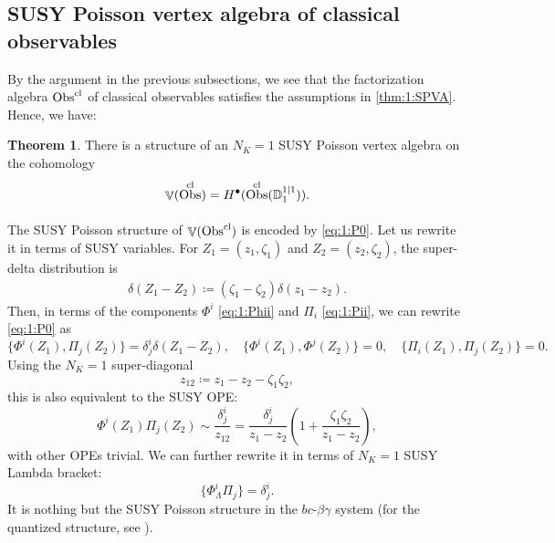 \documentclass[final,reqno]{amsart}
\numberwithin{equation}{section}
\theoremstyle{definition}
\newtheorem{thm}{Theorem}[section]
\newcommand{\bl}{\bullet}
\newcommand{\ceq}{\coloneqq} %
\newcommand{\tcl}{\textup{cl}}
\newcommand{\bbC}{\mathbb{C}}
\newcommand{\bbR}{\mathbb{R}}
\newcommand{\sD}{\mathbb{D}^{1|1}}
\newcommand{\abs}[1]{\left| #1 \right|}
\newcommand{\cObs}[1]{\mathop{\Obs^{\textup{cl}}_{#1}}}
\DeclareMathOperator{\bbV}{\mathbb{V}}
\DeclareMathOperator{\Obs}{Obs}
\begin{document}

\subsection{SUSY Poisson vertex algebra of classical observables}
\label{ss:2.8}

By the argument in the previous subsections, 
we see that the factorization algebra $\cObs{}$ of classical observables 
satisfies the assumptions in \cref{thm:1:SPVA}. 
Hence, we have:

\begin{thm}\label{thm:2:V(cObs)}
There is a structure of an $N_K=1$ SUSY Poisson vertex algebra on the cohomology
\[
 \bbV(\cObs{}) = H^{\bl}(\cObs{}(\sD_1)).
\]
\end{thm}

The SUSY Poisson structure of $\bbV(\cObs{})$ is encoded by \eqref{eq:1:P0}.
Let us rewrite it in terms of SUSY variables.
For $Z_1=(z_1,\zeta_1)$ and $Z_2=(z_2,\zeta_2)$, 
the super-delta distribution is
\begin{align}\label{eq:2:Sdelta}
 \delta(Z_1-Z_2) \ceq (\zeta_1-\zeta_2) \delta(z_1-z_2).
\end{align}
Then, in terms of the components $\Phi^i$ \eqref{eq:1:Phii} 
and $\Pi_i$ \eqref{eq:1:Pii}, we can rewrite \eqref{eq:1:P0} as 
\[
 \{\Phi^i(Z_1),\Pi_j (Z_2)\} = \delta^i_j \delta(Z_1-Z_2), \quad
 \{\Phi^i(Z_1),\Phi^j(Z_2)\} =  0, \quad 
 \{\Pi_i (Z_1),\Pi_j (Z_2)\} =  0.
\]
Using the $N_K=1$ super-diagonal 
\[
 z_{12} \ceq z_1-z_2-\zeta_1\zeta_2, 
\]
this is also equivalent to the SUSY OPE:
\[
 \Phi^i(Z_1)\Pi_j(Z_2) \sim \frac{\delta^i_j}{z_{12}} = 
 \frac{\delta^i_j}{z_1-z_2}\left(1+\frac{\zeta_1\zeta_2}{z_1-z_2}\right),
\]
with other OPEs trivial.
We can further rewrite it in terms of $N_K=1$ SUSY Lambda bracket:
\[
 \{\Phi^i_\Lambda \Pi_j\} = \delta^i_j.
\]
It is nothing but the SUSY Poisson structure in the $bc$-$\beta\gamma$ system 
(for the quantized structure, see \cite[Example 5.4]{HK}).
\end{document}
